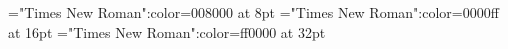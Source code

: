 \documentclass[a4paper]{article}
\begin{document}
 
\pagestyle{plain} 
\font\tctbta="Times New Roman":color=008000 at 8pt
\font\tbta="Times New Roman":color=0000ff at 16pt
\font\ta="Times New Roman":color=ff0000 at 32pt
\pagestyle{fancy} 

\end{document}
